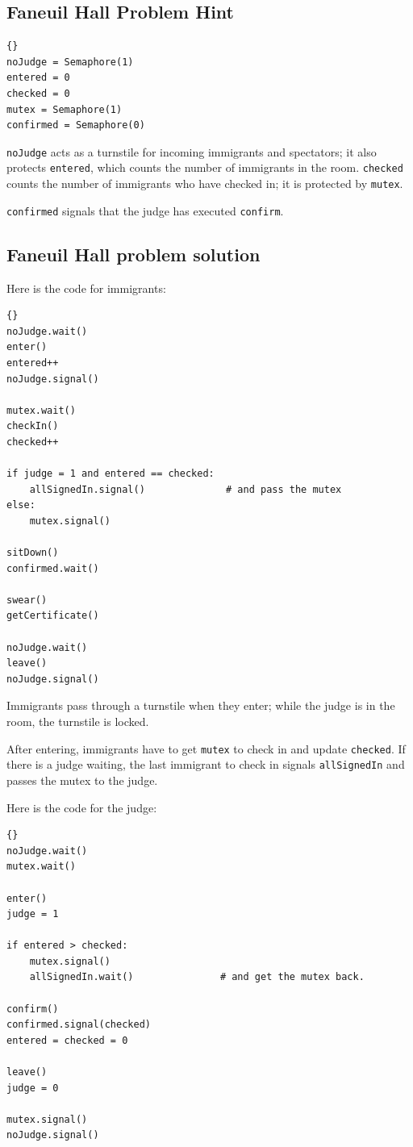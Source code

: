 \documentclass{book}
\newcommand{\clearemptydoublepage}{\newpage\cleardoublepage}
\begin{document}
\clearemptydoublepage
\subsection {Faneuil Hall Problem Hint}

\begin{lstlisting}[title={Faneuil Hall problem hint}]{}
noJudge = Semaphore(1)
entered = 0
checked = 0
mutex = Semaphore(1)
confirmed = Semaphore(0)
\end{lstlisting}

{\tt noJudge} acts as a turnstile for incoming immigrants and
spectators; it also protects {\tt entered}, which counts the
number of immigrants in the room.  {\tt checked} counts the
number of immigrants who have checked in; it is protected by
{\tt mutex}.

{\tt confirmed} signals that the judge has executed {\tt confirm}.


\clearemptydoublepage
\subsection {Faneuil Hall problem solution}

Here is the code for immigrants:

\begin{lstlisting}[title={Faneuil Hall problem solution (immigrant)}]{}
noJudge.wait()
enter()
entered++
noJudge.signal()

mutex.wait()
checkIn()
checked++

if judge = 1 and entered == checked:
    allSignedIn.signal()              # and pass the mutex
else:
    mutex.signal()

sitDown()
confirmed.wait()

swear()
getCertificate()

noJudge.wait()
leave()
noJudge.signal()
\end{lstlisting}

Immigrants pass through a turnstile when they enter; while the
judge is in the room, the turnstile is locked.

After entering, immigrants have to get {\tt mutex} to check 
in and update {\tt checked}.  If there is a judge waiting, the
last immigrant to check in signals {\tt allSignedIn} and passes
the mutex to the judge.

Here is the code for the judge:

\begin{lstlisting}[title={Faneuil Hall problem solution (judge)}]{}
noJudge.wait()
mutex.wait()

enter()
judge = 1

if entered > checked:
    mutex.signal()
    allSignedIn.wait()               # and get the mutex back.

confirm()
confirmed.signal(checked)
entered = checked = 0

leave()
judge = 0

mutex.signal()
noJudge.signal()
\end{lstlisting}
\end{document}
